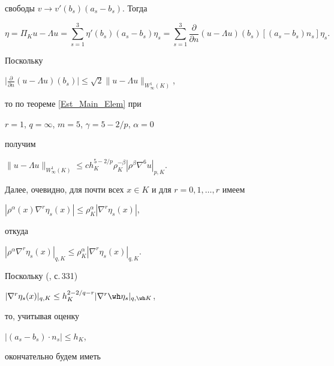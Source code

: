 свободы $v \to v'(b_s)(a_s-b_s)$. Тогда


$$


\eta =\Pi_K u-\Lambda u=\sum_{s=1}^3 {\eta '( {b_s} 


)}( {a_s-b_s} )\eta _s=




\sum_{s=1}^3 


\frac{\partial}{\partial n}( {u-\Lambda u} )( {b_s} 


)[ {( {a_s-b_s} )n_s} ]\eta _s.




$$


Поскольку 


$\Big| \frac{\partial}{\partial n}( {u-\Lambda u} )


( {b_s} ) \Big|\le \sqrt 2\| {u-\Lambda u} 


\|_{W_\infty ^1( K )}$,


то по теореме \ref{Est_Main_Elem} при 


$r=1$, $q=\infty$, $m=5$, $\gamma = 5-2/p$, $\alpha = 0$ 


получим




$\| {u-\Lambda u} 


\|_{W_\infty ^1( K )} \le


ch_K^{5-2/p} \rho_K ^{-\beta} | {\rho ^\beta \nabla ^6 u} |_{p,K}$. 


Далее, очевидно, для почти всех $x \in K $ и для $r= 0,1, \dotsc, r$ имеем


$| {\rho ^\alpha ( x )\nabla ^r\eta _s( x )} |\le 


\rho _K^\alpha | {\nabla ^r\eta _s( x )} |$,


откуда


$| {\rho ^\alpha \nabla ^r\eta _s( x )} |_{q,K}\le 


\rho _K^\alpha | {\nabla ^r\eta _s( x )} |_{q,K}$.


Поскольку (\cite{Ciarle}, с.\,331)


$| {\nabla ^r\eta _s( x )} |_{q,K}\le h_K^{2-2/q-r}|


{\nabla ^r\wh \eta _s} |_{q,\wh K}$,


то, учитывая оценку 


$| {( { {a_s-b_s} } )\cdot n_s} |\le h_{K}$,


окончательно будем иметь


